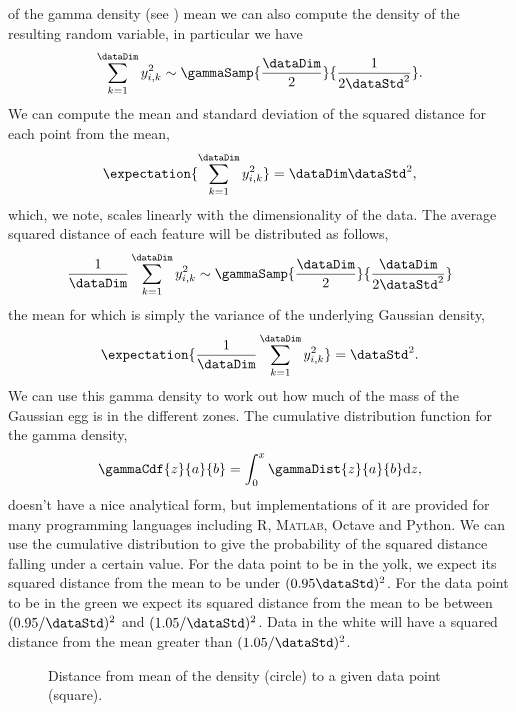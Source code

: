 of the gamma density (see )
mean we can also compute the density of the resulting random variable,
in particular we have
\[
\sum_{k=1}^{\dataDim}y_{i,k}^{2}\sim\gammaSamp{\frac{\dataDim}{2}}{\frac{1}{2\dataStd^{2}}}.
\]
We can compute the mean and standard deviation of the squared distance
for each point from the mean,
\[
\expectation{\sum_{k=1}^{\dataDim}y_{i,k}^{2}}=\dataDim\dataStd^{2},
\]
which, we note, scales linearly with the dimensionality of the
data. The average squared distance of each feature will be distributed as
follows,
\[
\frac{1}{\dataDim}\sum_{k=1}^{\dataDim}y_{i,k}^{2}\sim\gammaSamp{\frac{\dataDim}{2}}{\frac{\dataDim}{2\dataStd^{2}}}
\]
the mean for which is simply the variance of the underlying Gaussian
density,
\[
\expectation{\frac{1}{\dataDim}\sum_{k=1}^{\dataDim}y_{i,k}^{2}}=\dataStd^{2}.
\]
We can use this gamma density to work out how much of the mass of the
Gaussian egg is in the different zones. The cumulative distribution
function for the gamma density,
\[
\gammaCdf{z}{a}{b} = \int_0^{x}\gammaDist{z}{a}{b} \text{d} z,
\]
doesn't have a nice analytical form, but implementations of it are
provided for many programming languages including R, \textsc{Matlab},
Octave and Python. We can use the cumulative distribution to give the
probability of the squared distance falling under a certain value. For
the data point to be in the yolk, we expect its squared distance from
the mean to be under $(0.95\dataStd)^2$. For the data point to be in
the green we expect its squared distance from the mean to be between
$(0.95/\dataStd)^2$ and $(1.05/\dataStd)^2$. Data in the white will
have a squared distance from the mean greater than
$(1.05/\dataStd)^2$.
% 
\begin{figure}
  \begin{center}
    
  \end{center}

  \caption{Distance from mean of the density (circle) to a given
    data point (square).}
\end{figure}

